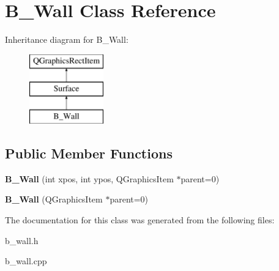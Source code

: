 \hypertarget{class_b___wall}{}\section{B\+\_\+\+Wall Class Reference}
\label{class_b___wall}
Inheritance diagram for B\+\_\+\+Wall\+:\begin{figure}[H]
\begin{center}
\leavevmode
\includegraphics[height=3.000000cm]{class_b___wall}
\end{center}
\end{figure}
\subsection*{Public Member Functions}
\begin{DoxyCompactItemize}
\item 
\hypertarget{class_b___wall_ad83db8883f6d620be7f9430b962c5774}{}{\bfseries B\+\_\+\+Wall} (int xpos, int ypos, Q\+Graphics\+Item $\ast$parent=0)\label{class_b___wall_ad83db8883f6d620be7f9430b962c5774}

\item 
\hypertarget{class_b___wall_a04cf7394644c9ca59a21e0e4dc1e63a6}{}{\bfseries B\+\_\+\+Wall} (Q\+Graphics\+Item $\ast$parent=0)\label{class_b___wall_a04cf7394644c9ca59a21e0e4dc1e63a6}

\end{DoxyCompactItemize}


The documentation for this class was generated from the following files\+:\begin{DoxyCompactItemize}
\item 
b\+\_\+wall.\+h\item 
b\+\_\+wall.\+cpp\end{DoxyCompactItemize}
